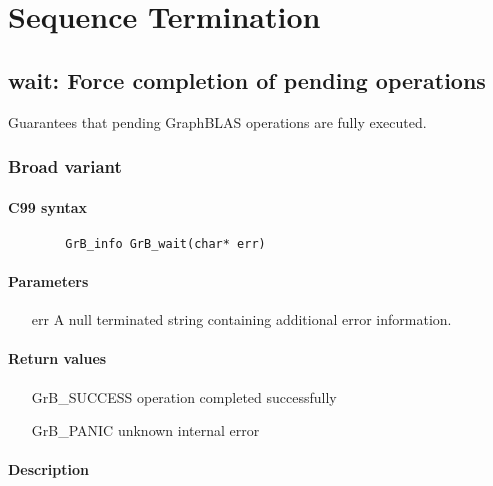 \section{Sequence Termination}

\subsection{{\sf wait}: Force completion of pending operations}
\label{Sec:wait}


Guarantees that pending GraphBLAS operations are fully executed.

\subsubsection{Broad variant}

\paragraph{C99 syntax}

\begin{verbatim}
        GrB_info GrB_wait(char* err)
\end{verbatim}

\paragraph{Parameters}
\begin{itemize}[leftmargin=1.1in]
\item[{\sf err}]     A null terminated string containing additional error
information.
\end{itemize}


\paragraph{Return values}
\begin{itemize}[leftmargin=2.1in]
\item[{\sf GrB\_SUCCESS}]	operation completed successfully
\item[{\sf GrB\_PANIC}]		unknown internal error
\end{itemize}

\paragraph{Description}

